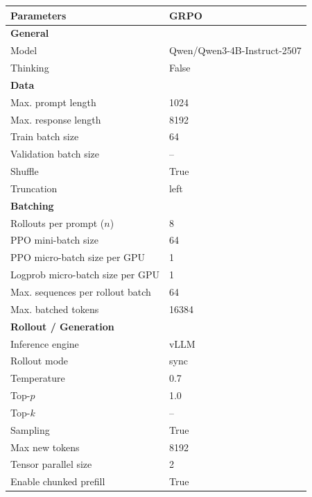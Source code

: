 \begin{table}[h!]
\centering
\small
\setlength{\tabcolsep}{10pt}
\renewcommand{\arraystretch}{1.15}
\fontsize{8pt}{8.5pt}\selectfont
\begin{tabular}{p{5.5cm}p{7cm}}
\toprule
\textbf{Parameters} & \textbf{GRPO} \\
\midrule

\textbf{General} & \\
Model &  Qwen/Qwen3-4B-Instruct-2507\\
Thinking & False \\

\midrule
\textbf{Data} & \\
Max. prompt length & 1024 \\
Max. response length & 8192 \\
Train batch size & 64 \\
Validation batch size & -- \\
Shuffle & True \\
Truncation & left \\

\midrule
\textbf{Batching} & \\
Rollouts per prompt ($n$) & 8 \\
PPO mini-batch size & 64 \\
PPO micro-batch size per GPU & 1 \\
Logprob micro-batch size per GPU & 1 \\
Max. sequences per rollout batch & 64 \\
Max. batched tokens & 16384 \\

\midrule
\textbf{Rollout / Generation} & \\
Inference engine & vLLM \\
Rollout mode & sync \\
Temperature & 0.7 \\
Top-$p$ & 1.0 \\
Top-$k$ & -- \\
Sampling & True \\
Max new tokens & 8192 \\
Tensor parallel size & 2 \\
Enable chunked prefill & True \\


\end{tabular}
\end{table}
